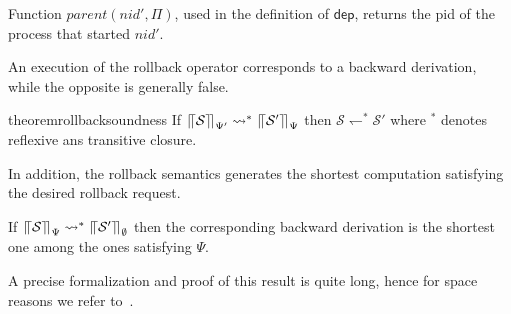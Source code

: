 \documentclass[runningheads]{llncs}
\newcommand{\system}{{\mathcal S}}
\newcommand{\ms}[1]{\mathsf{#1}}
\newcommand{\ul}[1]{\underline{#1}}
\newcommand{\lh}{\leftharpoondown}
\newcommand{\sqll}{\mbox{$\lceil\hspace{-.5ex}\lceil$}}
\newcommand{\sqrr}{\mbox{$\rceil\hspace{-.4ex}\rceil$}}
\newcommand{\gn}{\rightsquigarrow}
\begin{document}
Function $parent(nid',\Pi)$, used in the definition of $\ms{dep}$, returns the pid of the process that started
$nid'$.



An execution of the rollback operator corresponds to a backward derivation, while
the opposite is generally false.

\begin{restatable}{theorem}{rollbacksoundness}
  If $\sqll \system \sqrr_{\Psi'} \gn^* \sqll \system'\sqrr_{\Psi}$ then $\system \lh^* \system'$ where $\mbox{}^*$ denotes reflexive ans transitive closure.
\end{restatable}

In addition, the rollback semantics generates the
shortest computation satisfying the desired rollback request.

\begin{theorem}
  If $\sqll \system \sqrr_{\Psi} \gn^* \sqll \system'\sqrr_{\emptyset}$ then
  the corresponding backward derivation is the shortest one among the ones satisfying $\Psi$.
\end{theorem}
A precise formalization and proof of this result is quite long, hence for space reasons we refer to~\cite[Theorem 3.2]{tesi}.
\end{document}
